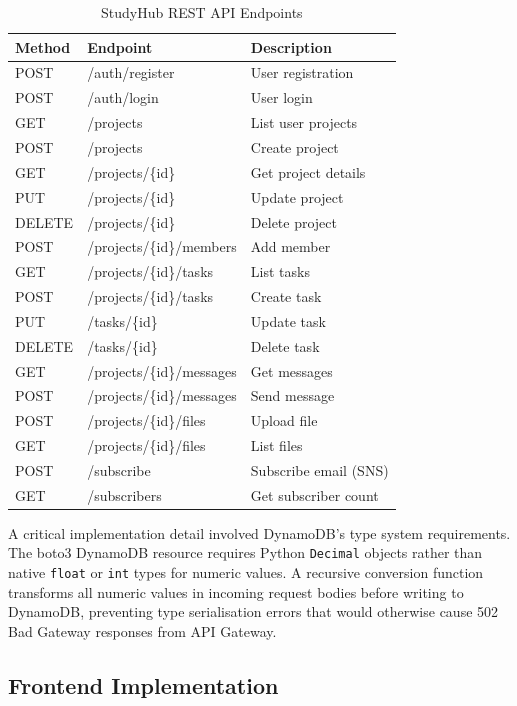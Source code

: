 \documentclass[conference]{IEEEtran}
\begin{document}
\begin{table}[H]
\centering
\caption{StudyHub REST API Endpoints}
\label{tab:endpoints}
\begin{tabular}{|l|l|l|}
\hline
\textbf{Method} & \textbf{Endpoint} & \textbf{Description} \\
\hline
POST & /auth/register & User registration \\
POST & /auth/login & User login \\
\hline
GET & /projects & List user projects \\
POST & /projects & Create project \\
GET & /projects/\{id\} & Get project details \\
PUT & /projects/\{id\} & Update project \\
DELETE & /projects/\{id\} & Delete project \\
POST & /projects/\{id\}/members & Add member \\
\hline
GET & /projects/\{id\}/tasks & List tasks \\
POST & /projects/\{id\}/tasks & Create task \\
PUT & /tasks/\{id\} & Update task \\
DELETE & /tasks/\{id\} & Delete task \\
\hline
GET & /projects/\{id\}/messages & Get messages \\
POST & /projects/\{id\}/messages & Send message \\
\hline
POST & /projects/\{id\}/files & Upload file \\
GET & /projects/\{id\}/files & List files \\
\hline
POST & /subscribe & Subscribe email (SNS) \\
GET & /subscribers & Get subscriber count \\
\hline
\end{tabular}
\end{table}

A critical implementation detail involved DynamoDB's type system requirements. The boto3 DynamoDB resource requires Python \texttt{Decimal} objects rather than native \texttt{float} or \texttt{int} types for numeric values. A recursive conversion function transforms all numeric values in incoming request bodies before writing to DynamoDB, preventing type serialisation errors that would otherwise cause 502 Bad Gateway responses from API Gateway.

\subsection{Frontend Implementation}
\end{document}
